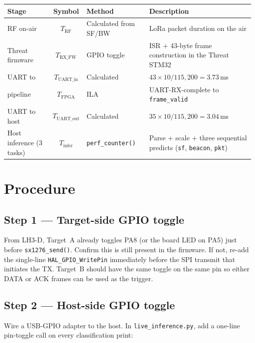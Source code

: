 \documentclass[11pt,letterpaper]{article}
\begin{document}
\begin{table}[h!]
	\centering
	\renewcommand{\arraystretch}{1.3}
	\begin{tabularx}{\textwidth}{l c l X}
		\toprule
		\textbf{Stage} & \textbf{Symbol} & \textbf{Method} & \textbf{Description} \\
		\midrule
		\mbox{RF} on-air          & $T_{\text{RF}}$       & Calculated from SF/BW & LoRa packet duration on the air \\
		Threat firmware            & $T_{\text{RX\_FW}}$    & \mbox{GPIO} toggle     & \mbox{ISR} + 43-byte frame construction in the Threat STM32 \\
		\mbox{UART} to \FPGA{}     & $T_{\text{UART\_in}}$  & Calculated            & $43 \times 10 / 115{,}200 = 3.73$\,ms \\
		\FPGA{} pipeline           & $T_{\text{FPGA}}$      & \mbox{ILA}            & UART-RX-complete to \texttt{frame\_valid} \\
		\mbox{UART} to host        & $T_{\text{UART\_out}}$ & Calculated            & $35 \times 10 / 115{,}200 = 3.04$\,ms \\
		Host inference (3 tasks)   & $T_{\text{infer}}$     & \texttt{perf\_counter()} & Parse + scale + three sequential predicts (\texttt{sf}, \texttt{beacon}, \texttt{pkt}) \\
		\bottomrule
	\end{tabularx}
\end{table}

\section{Procedure}

\subsection{Step 1 --- Target-side GPIO toggle}
From LH3-D, Target~A already toggles PA8 (or the board \mbox{LED} on PA5) just before \texttt{sx1276\_send()}. Confirm this is still present in the firmware. If not, re-add the single-line \texttt{HAL\_GPIO\_WritePin} immediately before the \mbox{SPI} transmit that initiates the \mbox{TX}. Target~B should have the same toggle on the same pin so either DATA or ACK frames can be used as the trigger.

\subsection{Step 2 --- Host-side GPIO toggle}
Wire a USB-\mbox{GPIO} adapter to the host. In \texttt{live\_inference.py}, add a one-line pin-toggle call on every classification print:
\end{document}
